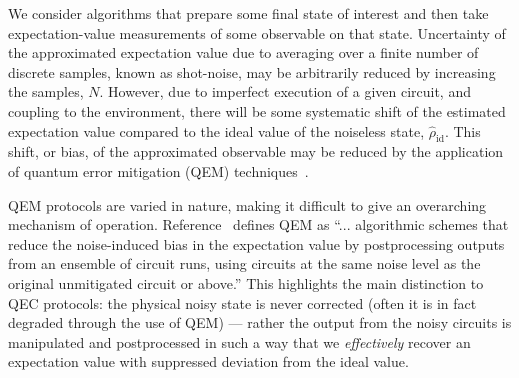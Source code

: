 We consider algorithms that prepare some final state of interest and then take expectation-value measurements of some observable on that state.
Uncertainty of the approximated expectation value due to averaging over a finite
number of discrete samples, known as shot-noise, may be arbitrarily reduced by
increasing the samples, $N$. However, due to imperfect execution of a given
circuit, and coupling to the environment, there will be some systematic shift of
the estimated expectation value compared to the ideal value of the noiseless state, $\hat\rho_\mathrm{id}$. This shift, or
bias, of the approximated observable may be reduced by the application of
quantum error
mitigation (QEM) techniques~\cite{temme_error_2017, cai_quantum_2023}. \

QEM protocols are varied in nature, making it difficult to give an overarching mechanism of operation. Reference~\cite{cai_quantum_2023} defines QEM as
``... algorithmic schemes that reduce the noise-induced bias in the expectation
value by postprocessing outputs from an ensemble of circuit runs, using circuits
at the same noise level as the original unmitigated circuit or above.''
This highlights the main distinction to QEC protocols: the physical noisy state
is never corrected (often it is in fact degraded through the use of QEM) ---
rather the output from the noisy circuits is manipulated and postprocessed in
such a way that we \textit{effectively} recover an expectation value with
suppressed deviation from the ideal value.

